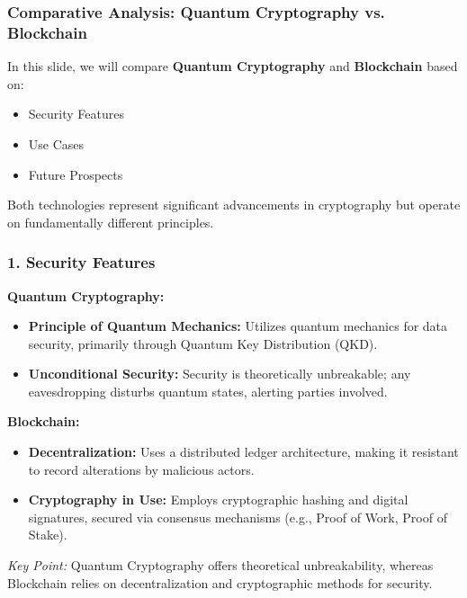 \documentclass{beamer}
\begin{document}
\begin{frame}[fragile]
    \frametitle{Comparative Analysis: Quantum Cryptography vs. Blockchain}
    In this slide, we will compare \textbf{Quantum Cryptography} and \textbf{Blockchain} based on:
    \begin{itemize}
        \item Security Features
        \item Use Cases
        \item Future Prospects
    \end{itemize}
    Both technologies represent significant advancements in cryptography but operate on fundamentally different principles.
\end{frame}

\begin{frame}[fragile]
    \frametitle{1. Security Features}
    \textbf{Quantum Cryptography:}
    \begin{itemize}
        \item \textbf{Principle of Quantum Mechanics:} Utilizes quantum mechanics for data security, primarily through Quantum Key Distribution (QKD).
        \item \textbf{Unconditional Security:} Security is theoretically unbreakable; any eavesdropping disturbs quantum states, alerting parties involved.
    \end{itemize}

    \textbf{Blockchain:}
    \begin{itemize}
        \item \textbf{Decentralization:} Uses a distributed ledger architecture, making it resistant to record alterations by malicious actors.
        \item \textbf{Cryptography in Use:} Employs cryptographic hashing and digital signatures, secured via consensus mechanisms (e.g., Proof of Work, Proof of Stake).
    \end{itemize}
    
    \textit{Key Point:} Quantum Cryptography offers theoretical unbreakability, whereas Blockchain relies on decentralization and cryptographic methods for security.
\end{frame}
\end{document}
